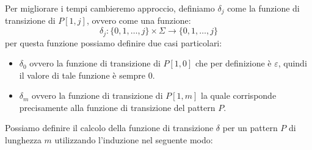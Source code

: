 Per migliorare i tempi cambieremo approccio, definiamo $\delta_j$ come la funzione
di transizione di $P[1, j]$, ovvero come una funzione:
\begin{equation}
    \delta_j: \{0, 1, \dots, j\} \times \Sigma \to \{0, 1, \dots, j\}
\end{equation}
per questa funzione possiamo definire due casi particolari:
\begin{itemize}
    \item $\delta_0$ ovvero la funzione di transizione di $P[1, 0]$ che per
          definizione è $\varepsilon$, quindi il valore di tale funzione è sempre
          $0$.
    \item $\delta_m$ ovvero la funzione di transizione di $P[1, m]$ la quale
          corrisponde precisamente alla funzione di transizione del pattern $P$.
\end{itemize}
Possiamo definire il calcolo della funzione di transizione $\delta$ per un pattern
$P$ di lunghezza $m$ utilizzando l'induzione nel seguente modo:
